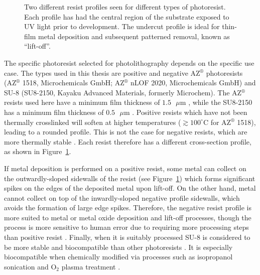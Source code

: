 \documentclass[
  a4paper,
]{scrbook}
\begin{document}
\begin{figure}
\begin{minipage}[t]{0.47\linewidth}
{{}

}

\end{minipage}%

\caption{\label{fig-photolithography-profiles}Two different resist
profiles seen for different types of photoresist. Each profile has had
the central region of the substrate exposed to UV light prior to
development. The undercut profile is ideal for thin-film metal
deposition and subsequent patterned removal, known as ``lift-off''.}

\end{figure}

The specific photoresist selected for photolithography depends on the
specific use case. The types used in this thesis are positive and
negative AZ\(^\circledR\) photoresists (AZ\(^\circledR\) 1518,
Microchemicals GmbH; AZ\(^\circledR\) nLOF 2020, Microchemicals GmbH)
and SU-8 (SU8-2150, Kayaku Advanced Materials, formerly Microchem). The
AZ\(^\circledR\) resists used here have a minimum film thickness of
\(1.5\textrm{ } \mu \textrm{m}\) \autocite{Microchemicals}, while the
SU8-2150 has a minimum film thickness of
\(0.5\textrm{ } \mu \textrm{m}\) \autocite{Kayaku}. Positive resists
which have not been thermally crosslinked will soften at higher
temperatures (\(\gtrsim 100^\circ\)C for AZ\(^\circledR\) 1518), leading
to a rounded profile. This is not the case for negative resists, which
are more thermally stable \autocite{Microchemicals}. Each resist
therefore has a different cross-section profile, as shown in
Figure~\ref{fig-photolithography-profiles}.

If metal deposition is performed on a positive resist, some metal can
collect on the outwardly-sloped sidewalls of the resist (see
Figure~\ref{fig-photolithography-profiles}) which forms significant
spikes on the edges of the deposited metal upon lift-off. On the other
hand, metal cannot collect on top of the inwardly-sloped negative
profile sidewalls, which avoids the formation of large edge spikes.
Therefore, the negative resist profile is more suited to metal or metal
oxide deposition and lift-off processes, though the process is more
sensitive to human error due to requiring more processing steps than
positive resist \autocite{Microchemicals}. Finally, when it is suitably
processed SU-8 is considered to be more stable and biocompatible than
other photoresists \autocite{Albarghouthi2022}. It is especially
biocompatible when chemically modified via processes such as isopropanol
sonication and O\(_2\) plasma treatment \autocite{Chen2021}.
\end{document}
